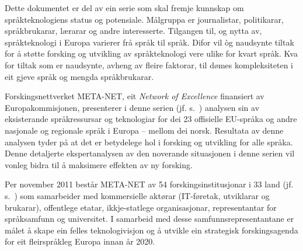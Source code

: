 Dette dokumentet er del av ein serie som skal fremje kunnskap om språkteknologiens status og potensiale. Målgruppa er journalistar, politikarar, språkbrukarar, lærarar og andre interesserte. Tilgangen til, og nytta av, språkteknologi i Europa varierer frå språk til språk. Difor vil òg naudsynte tiltak for å støtte forsking og utvikling av språkteknologi vere ulike for kvart språk. Kva for tiltak som er naudsynte, avheng av fleire faktorar, til dømes kompleksiteten i eit gjeve språk og mengda språkbrukarar.

Forskingsnettverket META-NET, eit \emph{Network of Excellence} finansiert av Europakommisjonen, presenterer i denne serien  (jf. s.~\pageref{whitepaperseries}) analysen sin av eksisterande språkressursar og teknologiar for dei 23 offisielle EU-språka og andre nasjonale og regionale språk i Europa -- mellom dei norsk. Resultata av denne analysen tyder på at det er betydelege hol i forsking og utvikling for alle språka. Denne detaljerte ekspertanalysen av den noverande situasjonen i denne serien vil vonleg bidra til å maksimere effekten av ny forsking.

Per november 2011 består META-NET av 54 forskingsinstitusjonar i 33 land (jf. s.~\pageref{metanetmembers}) som samarbeider med kommersielle aktørar (IT-føretak, utviklarar og brukarar), offentlege etatar, ikkje-statlege organisasjonar, representantar for språksamfunn og universitet. I samarbeid med desse samfunnsrepresentantane er målet å skape ein felles teknologivisjon og å utvikle ein strategisk forskingsagenda for eit fleirspråkleg Europa innan år 2020.
